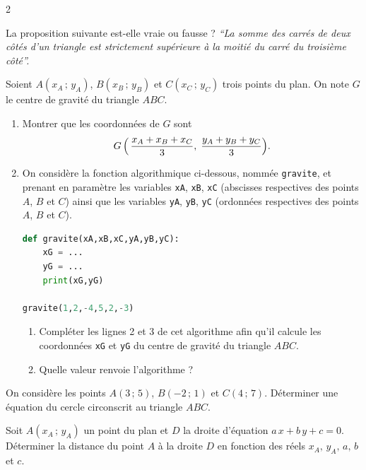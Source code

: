 \documentclass[a4paper,12pt]{article}
\begin{document}
\begin{multicols}{2}
\begin{exercice}[title=Exercice 14 $\star$ { [Raisonner, Représenter] }]{}{}
  La proposition suivante est-elle vraie ou fausse ?
  \emph{``La somme des carrés de deux côtés d'un triangle est strictement supérieure à la moitié du carré du troisième côté''.}
\end{exercice}

\begin{exercice}[title=Exercice 15 $\star\star$ { [Représenter, Calculer] }]{}{}
  Soient $A(x_A\,;\,y_A)$, $B(x_B\,;\,y_B)$ et $C(x_C\,;\,y_C)$ trois points du plan. On note $G$ le centre de gravité du triangle $ABC$.
  \begin{enumerate}
    \item Montrer que les coordonnées de $G$ sont
      $$G\,\Bigl(\,\dfrac{x_A + x_B + x_C}{3},\;\dfrac{y_A + y_B + y_C}{3}\Bigr).$$
    \item On considère la fonction algorithmique ci-dessous, nommée \texttt{gravite}, et prenant en paramètre les variables \texttt{xA}, \texttt{xB}, \texttt{xC} (abscisses respectives des points $A$, $B$ et $C$) ainsi que les variables \texttt{yA}, \texttt{yB}, \texttt{yC} (ordonnées respectives des points $A$, $B$ et $C$).

        \begin{lstlisting}[language=Python]
def gravite(xA,xB,xC,yA,yB,yC):
    xG = ...
    yG = ...
    print(xG,yG)

gravite(1,2,-4,5,2,-3)
        \end{lstlisting}

      \begin{enumerate}
        \item[(a)] Compléter les lignes 2 et 3 de cet algorithme afin qu'il calcule les coordonnées \texttt{xG} et \texttt{yG} du centre de gravité du triangle $ABC$.
        \item[(b)] Quelle valeur renvoie l'algorithme ?
      \end{enumerate}
  \end{enumerate}
\end{exercice}

\begin{exercice}[title=Exercice 16 $\star\star\star$ { [Représenter, Calculer] }]{}{}
  On considère les points $A(3\,;\,5)$, $B(-2\,;\,1)$ et $C(4\,;\,7)$. Déterminer une équation du cercle circonscrit au triangle $ABC$.
\end{exercice}


\begin{exercice}[title=Exercice 17 $\star\star\star$ { [Chercher, Représenter, Calculer] }]{}{}
  Soit $A(x_A\,;\,y_A)$ un point du plan et $D$ la droite d'équation $a\,x + b\,y + c = 0$.
  Déterminer la distance du point $A$ à la droite $D$ en fonction des réels $x_A,\,y_A,\,a,\,b$ et $c$.
\end{exercice}


\end{multicols}
\end{document}
